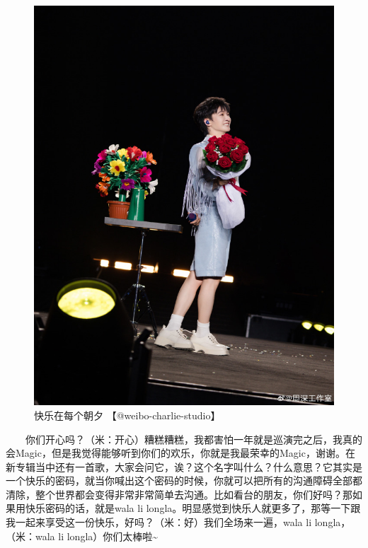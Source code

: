 \documentclass[]{ctexbook}
\begin{document}
\begin{figure}

{\centering \includegraphics[width=450pt]{img/nanjing20240811/001} 

}

\caption{快乐在每个朝夕 【@weibo-charlie-studio】}\label{fig:unnamed-chunk-70}
\end{figure}

  你们开心吗？（米：开心）糟糕糟糕，我都害怕一年就是巡演完之后，我真的会Magic，但是我觉得能够听到你们的欢乐，你就是我最荣幸的Magic，谢谢。在新专辑当中还有一首歌，大家会问它，诶？这个名字叫什么？什么意思？它其实是一个快乐的密码，就当你喊出这个密码的时候，你就可以把所有的沟通障碍全部都清除，整个世界都会变得非常非常简单去沟通。比如看台的朋友，你们好吗？那如果用快乐密码的话，就是wala li longla。明显感觉到快乐人就更多了，那等一下跟我一起来享受这一份快乐，好吗？（米：好）我们全场来一遍，wala li longla，（米：wala li longla）你们太棒啦\textasciitilde{}
\end{document}
